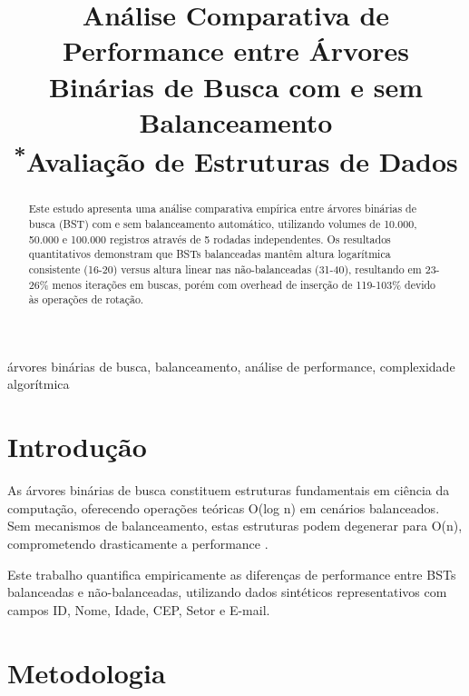 \documentclass[conference]{IEEEtran}
\begin{document}
\title{Análise Comparativa de Performance entre Árvores Binárias de Busca com e sem Balanceamento\\
{\footnotesize \textsuperscript{*}Avaliação de Estruturas de Dados}
}

\author{
}

\maketitle

\begin{abstract}
Este estudo apresenta uma análise comparativa empírica entre árvores binárias de busca (BST) com e sem balanceamento automático, utilizando volumes de 10.000, 50.000 e 100.000 registros através de 5 rodadas independentes. Os resultados quantitativos demonstram que BSTs balanceadas mantêm altura logarítmica consistente (16-20) versus altura linear nas não-balanceadas (31-40), resultando em 23-26\% menos iterações em buscas, porém com overhead de inserção de 119-103\% devido às operações de rotação.
\end{abstract}

\begin{IEEEkeywords}
árvores binárias de busca, balanceamento, análise de performance, complexidade algorítmica
\end{IEEEkeywords}

\section{Introdução}
As árvores binárias de busca constituem estruturas fundamentais em ciência da computação, oferecendo operações teóricas O(log n) em cenários balanceados. Sem mecanismos de balanceamento, estas estruturas podem degenerar para O(n), comprometendo drasticamente a performance \cite{cormen2009}.

Este trabalho quantifica empiricamente as diferenças de performance entre BSTs balanceadas e não-balanceadas, utilizando dados sintéticos representativos com campos ID, Nome, Idade, CEP, Setor e E-mail.

\section{Metodologia}
\end{document}
